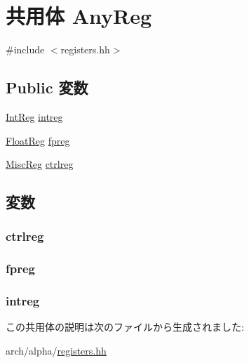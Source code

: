 \hypertarget{unionAlphaISA_1_1AnyReg}{
\section{共用体 AnyReg}
\label{unionAlphaISA_1_1AnyReg}
}


{\ttfamily \#include $<$registers.hh$>$}\subsection*{Public 変数}
\begin{DoxyCompactItemize}
\item 
\hyperlink{namespaceAlphaISA_a0e080577527fb3e9685399f75b5caf15}{IntReg} \hyperlink{unionAlphaISA_1_1AnyReg_a95ddd97e75712a86f53c43636e713a94}{intreg}
\item 
\hyperlink{namespaceAlphaISA_a06fae4f187c7c94b8b0046dd6802be48}{FloatReg} \hyperlink{unionAlphaISA_1_1AnyReg_a9154b30def3ee5315e8660e1a491c681}{fpreg}
\item 
\hyperlink{namespaceAlphaISA_aa16539aa6584fd12f7d6fa868f75b4de}{MiscReg} \hyperlink{unionAlphaISA_1_1AnyReg_ae69c08de24012a3af86f0f33249f321d}{ctrlreg}
\end{DoxyCompactItemize}


\subsection{変数}
\hypertarget{unionAlphaISA_1_1AnyReg_ae69c08de24012a3af86f0f33249f321d}{
\subsubsection[{ctrlreg}]{ {\bf ctrlreg}}}
\label{unionAlphaISA_1_1AnyReg_ae69c08de24012a3af86f0f33249f321d}
\hypertarget{unionAlphaISA_1_1AnyReg_a9154b30def3ee5315e8660e1a491c681}{
\subsubsection[{fpreg}]{ {\bf fpreg}}}
\label{unionAlphaISA_1_1AnyReg_a9154b30def3ee5315e8660e1a491c681}
\hypertarget{unionAlphaISA_1_1AnyReg_a95ddd97e75712a86f53c43636e713a94}{
\subsubsection[{intreg}]{ {\bf intreg}}}
\label{unionAlphaISA_1_1AnyReg_a95ddd97e75712a86f53c43636e713a94}


この共用体の説明は次のファイルから生成されました:\begin{DoxyCompactItemize}
\item 
arch/alpha/\hyperlink{alpha_2registers_8hh}{registers.hh}\end{DoxyCompactItemize}
